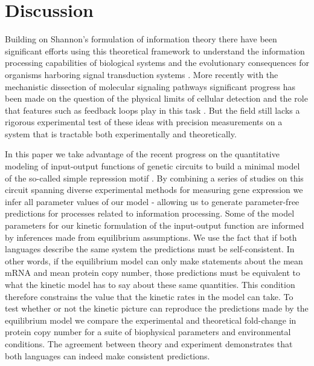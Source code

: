 \section*{Discussion}

Building on Shannon's formulation of information theory there have been
significant efforts using this theoretical framework to understand the
information processing capabilities of biological systems and the evolutionary
consequences for organisms harboring signal transduction systems
\cite{Bergstrom2004, Taylor2007a, Tkacik2008, Polani2009, Nemenman2010,
Rivoire2011}. More recently with the mechanistic dissection of molecular
signaling pathways significant progress has been made on the question of the
physical limits of cellular detection and the role that features such as
feedback loops play in this task \cite{Bialek2005, Libby2007, Tkacik2011,
Rhee2012a, Voliotis2014a}. But the field still lacks a rigorous experimental
test of these ideas with precision measurements on a system that is tractable
both experimentally and theoretically.

In this paper we take advantage of the recent progress on the quantitative
modeling of input-output functions of genetic circuits to build a minimal model
of the so-called simple repression motif . By combining a
series of studies on this circuit spanning diverse experimental methods for
measuring gene expression we infer all parameter values of our model - allowing
us to generate parameter-free predictions for processes related to information
processing. Some of the model parameters for our kinetic formulation of the
input-output function are informed by inferences made from equilibrium
assumptions. We use the fact that if both languages describe the same system the
predictions must be self-consistent. In other words, if the equilibrium model
can only make statements about the mean mRNA and mean protein copy number, those
predictions must be equivalent to what the kinetic model has to say about these
same quantities. This condition therefore constrains the value that the kinetic
rates in the model can take. To test whether or not the kinetic picture can
reproduce the predictions made by the equilibrium model we compare the
experimental and theoretical fold-change in protein copy number for a suite of
biophysical parameters and environmental conditions. The agreement between
theory and experiment demonstrates that both languages can indeed make
consistent predictions.

